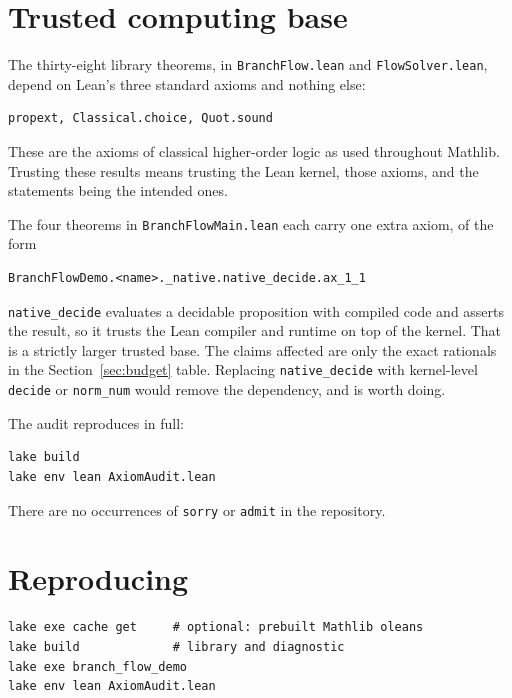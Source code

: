 \documentclass[11pt,a4paper]{article}
\theoremstyle{definition}
\newcommand{\lean}[1]{\texttt{#1}}
\begin{document}
\section{Trusted computing base}
\label{sec:tcb}

The thirty-eight library theorems, in \lean{BranchFlow.lean} and
\lean{FlowSolver.lean}, depend on Lean's three standard axioms and nothing
else:

\begin{Verbatim}[fontsize=\small,xleftmargin=1em]
propext, Classical.choice, Quot.sound
\end{Verbatim}

These are the axioms of classical higher-order logic as used throughout
Mathlib. Trusting these results means trusting the Lean kernel, those axioms,
and the statements being the intended ones.

The four theorems in \lean{BranchFlowMain.lean} each carry one extra axiom, of
the form

\begin{Verbatim}[fontsize=\small,xleftmargin=1em]
BranchFlowDemo.<name>._native.native_decide.ax_1_1
\end{Verbatim}

\lean{native\_decide} evaluates a decidable proposition with compiled code and
asserts the result, so it trusts the Lean compiler and runtime on top of the
kernel. That is a strictly larger trusted base. The claims affected are only
the exact rationals in the Section~\ref{sec:budget} table. Replacing
\lean{native\_decide} with kernel-level \lean{decide} or \lean{norm\_num} would
remove the dependency, and is worth doing.

The audit reproduces in full:

\begin{Verbatim}[fontsize=\small,xleftmargin=1em]
lake build
lake env lean AxiomAudit.lean
\end{Verbatim}

There are no occurrences of \lean{sorry} or \lean{admit} in the repository.

\section{Reproducing}

\begin{Verbatim}[fontsize=\small,xleftmargin=1em]
lake exe cache get     # optional: prebuilt Mathlib oleans
lake build             # library and diagnostic
lake exe branch_flow_demo
lake env lean AxiomAudit.lean
\end{Verbatim}
\end{document}
